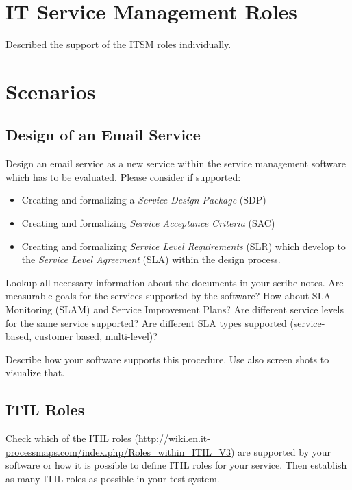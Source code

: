 \section{IT Service Management Roles}
\label{sec:ITSMRoles}

Described the support of the ITSM roles individually.

\section{Scenarios}
\label{sec:scenarios}

\subsection{Design of an Email Service}
\label{sec:emailServiceDesign}

Design an email service as a new service within the service management software which has to be evaluated. Please consider if supported:
\begin{itemize}
\item Creating and formalizing a \emph{Service Design Package} (SDP)
\item Creating and formalizing \emph{Service Acceptance Criteria} (SAC)
\item Creating and formalizing \emph{Service Level Requirements} (SLR) which develop to the \emph{Service Level Agreement} (SLA) within the design process.
\end{itemize}

Lookup all necessary information about the documents in your scribe notes. Are measurable goals for the services supported by the software? How about SLA-Monitoring (SLAM) and Service Improvement Plans? Are different service levels for the same service supported? Are different SLA types supported (service-based, customer based, multi-level)?

Describe how your software supports this procedure. Use also screen shots to visualize that.

\subsection{ITIL Roles}
\label{sec:itilRoles}

Check which of the ITIL roles (\url{http://wiki.en.it-processmaps.com/index.php/Roles_within_ITIL_V3}) are supported by your software or how it is possible to define ITIL roles for your service. Then establish as many ITIL roles as possible in your test system.

